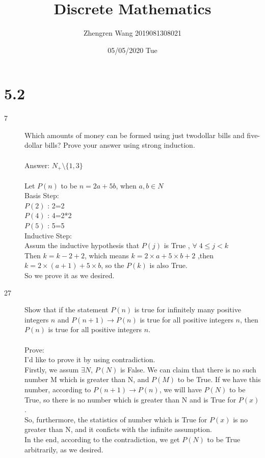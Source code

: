 \documentclass[UTF8]{article}
\title{Discrete Mathematics}
\author{Zhengren Wang 2019081308021}
\date{05/05/2020 Tue }
\begin{document}
\maketitle 

\part{5.2}
\begin{description}
    \item[7]Which amounts of money can be formed using just twodollar bills and five-dollar bills? Prove your answer using strong induction. \\\\
Answer: $N_+ \setminus \{1,3\}$  \\\\
Let $P(n)$ to be $n=2a+5b$, when $a,b \in N$ \\
Basis Step: \\
$P(2)$ : 2=2 \\
$P(4)$ : 4=2*2 \\
$P(5)$ : 5=5 \\
Inductive Step: \\
Assum the inductive hypothesis that $P(j)$ is True , $\forall \;4 \leq j < k$ \\
Then $k=k-2+2$, which means $k=2\times a+ 5\times b +2$ ,then $k=2 \times (a+1) + 5 \times b$, so the $P(k)$ is also True.\\
So we prove it as we desired.



    \item[27]Show that if the statement $P(n)$ is true for infinitely many positive integers $n$ and $P(n+1)\to P(n)$ is true for all positive integers $n$, then $P(n)$ is true for all positive integers $n$. \\\\
    Prove:\\
    I'd like to prove it by using contradiction. \\
    Firstly, we assum $\exists N$, $P(N)$ is False. We can claim that there is no such number M which is greater than N, and $P(M)$ to be True. If we have this number, according to $P(n+1)\to P(n)$, we will have $P(N)$ to be True, so there is no number which is greater than N and is True for $P(x)$.  \\
    So, furthermore, the statistics of number which is True for $P(x)$ is no greater than N, and it conficts with the infinite assumption.\\
    In the end, according to the contradiction, we get $P(N)$ to be True arbitrarily, as we desired.
\end{description}
\end{document}
